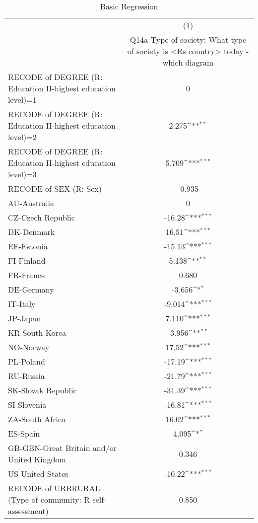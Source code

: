 \begin{table}[htbp]\centering
\def\sym#1{\ifmmode^{#1}\else\(^{#1}\)\fi}
\caption{Basic Regression\label{reg1}}
\begin{tabular}{l*{1}{c}}
\hline\hline
                    &\multicolumn{1}{c}{(1)}\\
                    &\multicolumn{1}{c}{Q14a Type of society: What type of society is <Rs country> today - which diagram}\\
\hline
RECODE of DEGREE (R: Education II-highest education level)=1&           0         \\
RECODE of DEGREE (R: Education II-highest education level)=2&       2.275\sym{**} \\
RECODE of DEGREE (R: Education II-highest education level)=3&       5.709\sym{***}\\
RECODE of SEX (R: Sex)&      -0.935         \\
AU-Australia        &           0         \\
CZ-Czech Republic   &      -16.28\sym{***}\\
DK-Denmark          &       16.51\sym{***}\\
EE-Estonia          &      -15.13\sym{***}\\
FI-Finland          &       5.138\sym{**} \\
FR-France           &       0.680         \\
DE-Germany          &      -3.656\sym{*}  \\
IT-Italy            &      -9.014\sym{***}\\
JP-Japan            &       7.110\sym{***}\\
KR-South Korea      &      -3.956\sym{**} \\
NO-Norway           &       17.52\sym{***}\\
PL-Poland           &      -17.19\sym{***}\\
RU-Russia           &      -21.79\sym{***}\\
SK-Slovak Republic  &      -31.39\sym{***}\\
SI-Slovenia         &      -16.81\sym{***}\\
ZA-South Africa     &       16.02\sym{***}\\
ES-Spain            &       4.095\sym{*}  \\
GB-GBN-Great Britain and/or United Kingdom&       0.346         \\
US-United States    &      -10.22\sym{***}\\
RECODE of URBRURAL (Type of community: R self-assessment)&       0.850         \\

\end{tabular}
\end{table}
